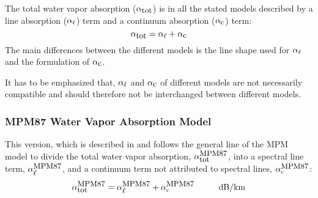 The total water vapor absorption ($\alpha_{\mbox{\rm \small tot}}$) is in all the stated models 
described by a line absorption ($\alpha_{\ell}$) term and a continuum absorption 
($\alpha_{\mbox{\small c}}$) term: 
\begin{equation}
  \label{eq:h2o:totabs}
  \alpha_{\mbox{\rm \small tot}} = \alpha_{\ell} + \alpha_{\mbox{\small c}}
\end{equation}
The main differences between the different models is the line shape used for 
$\alpha_{\ell}$ and the formulation of $\alpha_{\mbox{\small c}}$.

It has to be emphasized that, $\alpha_{\ell}$ and $\alpha_{\mbox{\small c}}$ of different
models are not necessarily compatible and should therefore not be 
interchanged between different models.


\subsubsection{MPM87 Water Vapor Absorption Model}
\label{leveld:mpm87}
This version, which is described in \citet{liebeandlayton:87} and 
follows the general line of the MPM model to divide the total 
water vapor absorption, $\alpha^{\mbox{\rm \small MPM87}}_{\mbox{\small tot}}$, into a spectral line 
term, $\alpha^{\mbox{\rm \small MPM87}}_{\mbox{\small $\ell$}}$, and a continuum term not attributed to 
spectral lines, $\alpha^{\mbox{\rm \small MPM87}}_{\rm c}$:
\begin{equation}
  \label{eq:mpm87_abs}
  \alphampmotot = \alphampmol + \alphampmoc\hspace*{10mm}\mbox{dB/km}
\end{equation}



